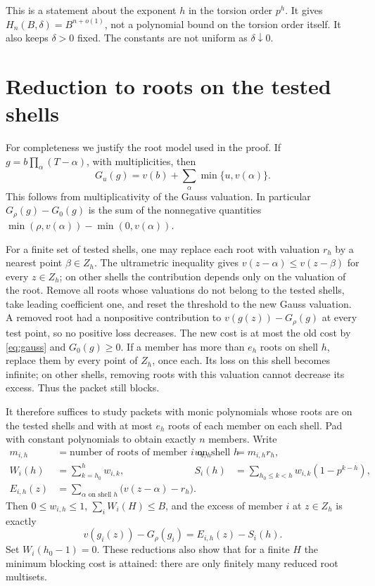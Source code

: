 \documentclass[11pt]{article}
\theoremstyle{remark}\newtheorem{remark}[theorem]{Remark}
\begin{document}
This is a statement about the exponent $h$ in the torsion order $p^h$.
It gives $H_n(B,\delta)=B^{n+o(1)}$, not a polynomial bound on the torsion order itself.
It also keeps $\delta>0$ fixed. The constants are not uniform as $\delta\downarrow0$.

\section{Reduction to roots on the tested shells}
For completeness we justify the root model used in the proof. If
$g=b\prod_\alpha(T-\alpha)$, with multiplicities, then
\begin{equation}\label{eq:gauss}
 G_u(g)=v(b)+\sum_\alpha\min\{u,v(\alpha)\}.
\end{equation}
This follows from multiplicativity of the Gauss valuation. In particular
$G_\rho(g)-G_0(g)$ is the sum of the nonnegative quantities
$\min(\rho,v(\alpha))-\min(0,v(\alpha))$.

For a finite set of tested shells, one may replace each root with valuation $r_h$
by a nearest point $\beta\in Z_h$. The ultrametric inequality gives
$v(z-\alpha)\le v(z-\beta)$ for every $z\in Z_h$; on other shells the contribution
depends only on the valuation of the root. Remove all roots whose valuations do not
belong to the tested shells, take leading coefficient one, and reset the threshold
to the new Gauss valuation. A removed root had a nonpositive contribution to
$v(g(z))-G_\rho(g)$ at every test point, so no positive loss decreases.
The new cost is at most the old cost by \eqref{eq:gauss} and $G_0(g)\ge0$.
If a member has more than $e_h$ roots on shell $h$, replace them by every point of
$Z_h$, once each. Its loss on this shell becomes infinite; on other shells, removing
roots with this valuation cannot decrease its excess. Thus the packet still blocks.

It therefore suffices to study packets with monic polynomials whose roots are on the
tested shells and with at most $e_h$ roots of each member on each shell. Pad with
constant polynomials to obtain exactly $n$ members. Write
\begin{align*}
 m_{i,h}&=\text{number of roots of member $i$ on shell $h$},&
 w_{i,h}&=m_{i,h}r_h,\\
 W_i(h)&=\sum_{k=h_0}^{h}w_{i,k},&
 S_i(h)&=\sum_{h_0\le k<h}w_{i,k}(1-p^{k-h}),\\
 E_{i,h}(z)&=\sum_{\alpha\text{ on shell }h}
                 \bigl(v(z-\alpha)-r_h\bigr).&&
\end{align*}
Then $0\le w_{i,h}\le1$, $\sum_i W_i(H)\le B$, and the excess of member $i$ at
$z\in Z_h$ is exactly
\begin{equation}\label{eq:excess}
 v(g_i(z))-G_\rho(g_i)=E_{i,h}(z)-S_i(h).
\end{equation}
Set $W_i(h_0-1)=0$. These reductions also show that for a finite $H$ the minimum
blocking cost is attained: there are only finitely many reduced root multisets.
\end{document}
